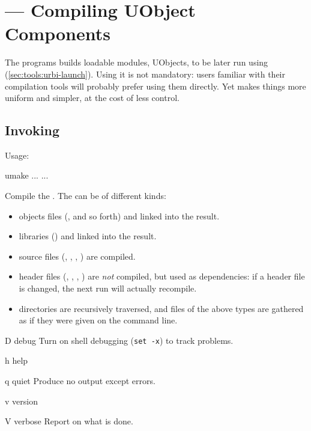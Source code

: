 \section{ --- Compiling UObject Components}
\label{sec:tools:umake}

The  programs builds loadable modules, UObjects, to be
later run using 
(\autoref{sec:tools:urbi-launch}).  Using it is not mandatory: users
familiar with their compilation tools will probably prefer using them
directly.  Yet  makes things more uniform and simpler,
at the cost of less control.

\subsection{Invoking }
\label{sec:tools:umake:invoke}

Usage:
\begin{shell}
umake ... ...
\end{shell}

Compile the .  The  can be of different kinds:
\begin{itemize}
\item objects files (,  and so forth) and linked
  into the result.
\item libraries () and linked into the result.
\item source files (, , , )
  are compiled.
\item header files (, , ,
  ) are \emph{not} compiled, but used as dependencies: if
  a header file is changed, the next  run will actually
  recompile.
\item directories are recursively traversed, and files of the above
  types are gathered as if they were given on the command line.
\end{itemize}

\begin{options}
\item[D]{debug} Turn on shell debugging (\lstinline|set -x|) to
  track  problems.
\item[h]{help} \optionHelp
\item[q]{quiet} Produce no output except errors.
\item[v]{version} \optionVersion
\item[V]{verbose} Report on what is done.
\end{options}

